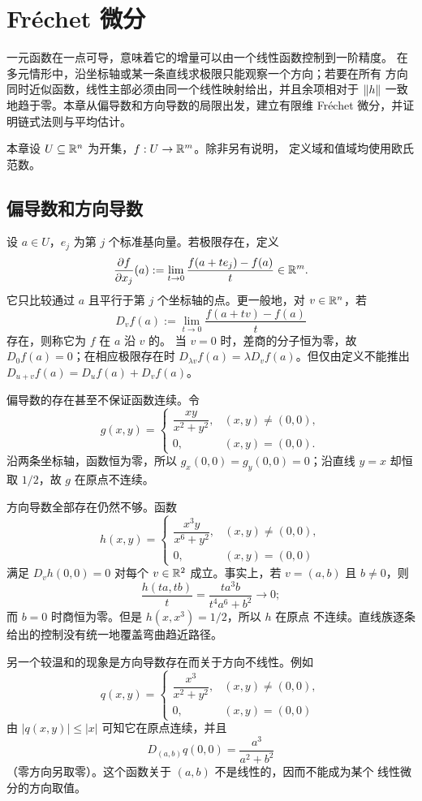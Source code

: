 \chapter{Fréchet 微分}
\label{chap:frechet-differential}

一元函数在一点可导，意味着它的增量可以由一个线性函数控制到一阶精度。
在多元情形中，沿坐标轴或某一条直线求极限只能观察一个方向；若要在所有
方向同时近似函数，线性主部必须由同一个线性映射给出，并且余项相对于
\(\left\lVert h\right\rVert\) 一致地趋于零。本章从偏导数和方向导数的局限出发，建立有限维
Fréchet 微分，并证明链式法则与平均估计。

本章设 \(U\subseteq\mathbb{R}^n\) 为开集，\(f:U\to\mathbb{R}^m\)。除非另有说明，
定义域和值域均使用欧氏范数。

\section{偏导数和方向导数}

设 \(a\in U\)，\(e_j\) 为第 \(j\) 个标准基向量。若极限存在，定义
\[
 \frac{\partial f}{\partial x_j}(a)
 :=\lim_{t\to0}\frac{f(a+te_j)-f(a)}{t}\in\mathbb{R}^m.
\]
它只比较通过 \(a\) 且平行于第 \(j\) 个坐标轴的点。更一般地，对
\(v\in\mathbb{R}^n\)，若
\[
 D_vf(a):=\lim_{t\to0}\frac{f(a+tv)-f(a)}{t}
\]
存在，则称它为 \(f\) 在 \(a\) 沿 \(v\) 的。
当 \(v=0\) 时，差商的分子恒为零，故 \(D_0f(a)=0\)；在相应极限存在时
\(D_{\lambda v}f(a)=\lambda D_vf(a)\)。但仅由定义不能推出
\(D_{u+v}f(a)=D_uf(a)+D_vf(a)\)。

偏导数的存在甚至不保证函数连续。令
\[
 g(x,y)=
 \begin{cases}
 \dfrac{xy}{x^2+y^2},&(x,y)\ne(0,0),\\[0.4em]
 0,&(x,y)=(0,0).
 \end{cases}
\]
沿两条坐标轴，函数恒为零，所以 \(g_x(0,0)=g_y(0,0)=0\)；沿直线
\(y=x\) 却恒取 \(1/2\)，故 \(g\) 在原点不连续。

方向导数全部存在仍然不够。函数
\[
 h(x,y)=
 \begin{cases}
 \dfrac{x^3y}{x^6+y^2},&(x,y)\ne(0,0),\\[0.4em]
 0,&(x,y)=(0,0)
 \end{cases}
\]
满足 \(D_vh(0,0)=0\) 对每个 \(v\in\mathbb{R}^2\) 成立。事实上，若
\(v=(a,b)\) 且 \(b\ne0\)，则
\[
 \frac{h(ta,tb)}{t}
 =\frac{t a^3b}{t^4a^6+b^2}\longrightarrow0;
\]
而 \(b=0\) 时商恒为零。但是 \(h(x,x^3)=1/2\)，所以 \(h\) 在原点
不连续。直线族逐条给出的控制没有统一地覆盖弯曲趋近路径。

另一个较温和的现象是方向导数存在而关于方向不线性。例如
\[
 q(x,y)=
 \begin{cases}
 \dfrac{x^3}{x^2+y^2},&(x,y)\ne(0,0),\\
 0,&(x,y)=(0,0)
 \end{cases}
\]
由 \(|q(x,y)|\le |x|\) 可知它在原点连续，并且
\[
 D_{(a,b)}q(0,0)=\frac{a^3}{a^2+b^2}
\]
（零方向另取零）。这个函数关于 \((a,b)\) 不是线性的，因而不能成为某个
线性微分的方向取值。

